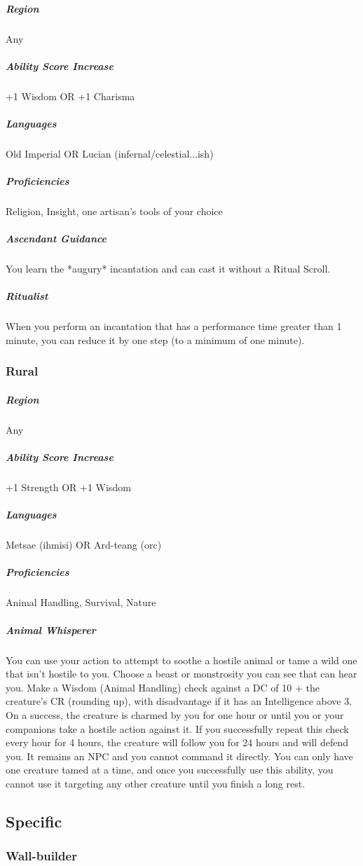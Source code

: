 \subparagraph*{Region} Any

\subparagraph*{Ability Score Increase} +1 Wisdom OR +1 Charisma

\subparagraph*{Languages} Old Imperial OR Lucian (infernal/celestial...ish)

\subparagraph*{Proficiencies} Religion, Insight, one artisan's tools of your choice

\subparagraph*{Ascendant Guidance} You learn the *augury* incantation and can cast it without a Ritual Scroll.

\subparagraph*{Ritualist} When you perform an incantation that has a performance time greater than 1 minute, you can reduce it by one step (to a minimum of one minute).

\subsubsection{Rural}
\subparagraph*{Region} Any

\subparagraph*{Ability Score Increase} +1 Strength OR +1 Wisdom

\subparagraph*{Languages} Metsae (ihmisi) OR Ard-teang (orc)

\subparagraph*{Proficiencies} Animal Handling, Survival, Nature

\subparagraph*{Animal Whisperer} You can use your action to attempt to soothe a hostile animal or tame a wild one that isn't hostile to you. Choose a beast or monstrosity you can see that can hear you. Make a Wisdom (Animal Handling) check against a DC of 10 + the creature's CR (rounding up), with disadvantage if it has an Intelligence above 3. On a success, the creature is charmed by you for one hour or until you or your companions take a hostile action against it. If you successfully repeat this check every hour for 4 hours, the creature will follow you for 24 hours and will defend you. It remains an NPC and you cannot command it directly. You can only have one creature tamed at a time, and once you successfully use this ability, you cannot use it targeting any other creature until you finish a long rest.

\subsection{Specific}
\subsubsection{Wall-builder}

